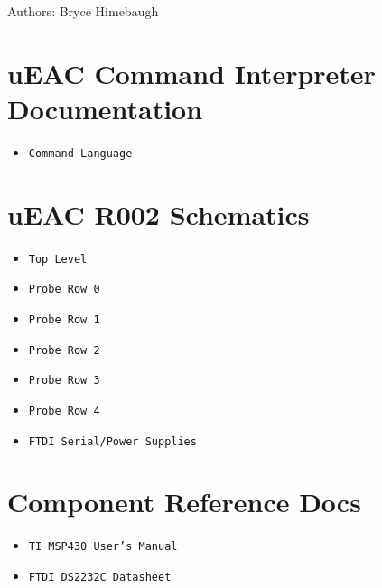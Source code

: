 \begin{Desc}
\item[Authors:]Bryce Himebaugh \end{Desc}
\section{u\-EAC Command Interpreter Documentation}\label{index_A}
\begin{itemize}
\item {\tt Command Language } \end{itemize}
\section{u\-EAC R002 Schematics}\label{index_B}
\begin{itemize}
\item {\tt Top Level } \item {\tt Probe Row 0} \item {\tt Probe Row 1} \item {\tt Probe Row 2} \item {\tt Probe Row 3} \item {\tt Probe Row 4} \item {\tt FTDI Serial/Power Supplies} \end{itemize}
\section{Component Reference Docs}\label{index_C}
\begin{itemize}
\item {\tt TI MSP430 User's Manual} \item {\tt FTDI DS2232C Datasheet} \end{itemize}
